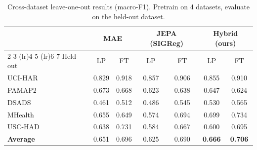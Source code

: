 \begin{table}[t]
\centering
\caption{Cross-dataset leave-one-out results (macro-F1). Pretrain on 4 datasets, evaluate on the held-out dataset.}
\label{tab:cross}
\begin{tabular}{lcccccc}
\toprule
& \multicolumn{2}{c}{MAE} & \multicolumn{2}{c}{JEPA (SIGReg)} & \multicolumn{2}{c}{\textbf{Hybrid (ours)}} \\
\cmidrule(lr){2-3} \cmidrule(lr){4-5} \cmidrule(lr){6-7}
Held-out & LP & FT & LP & FT & LP & FT \\
\midrule
UCI-HAR & 0.829 & 0.918 & 0.857 & 0.906 & 0.855 & 0.910 \\
PAMAP2 & 0.673 & 0.668 & 0.623 & 0.638 & 0.647 & 0.624 \\
DSADS & 0.461 & 0.512 & 0.486 & 0.545 & 0.530 & 0.565 \\
MHealth & 0.655 & 0.649 & 0.574 & 0.694 & 0.699 & 0.734 \\
USC-HAD & 0.638 & 0.731 & 0.584 & 0.667 & 0.600 & 0.695 \\
\midrule
\textbf{Average} & 0.651 & 0.696 & 0.625 & 0.690 & \textbf{0.666} & \textbf{0.706} \\
\bottomrule
\end{tabular}
\end{table}